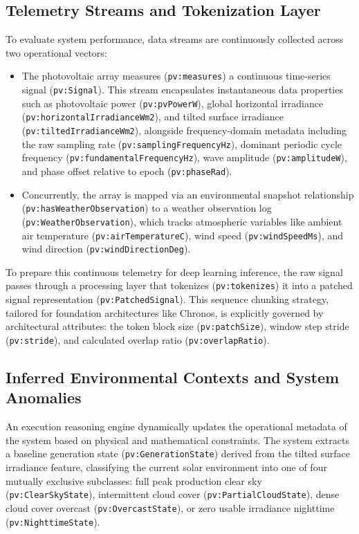 \subsection{Telemetry Streams and Tokenization Layer}
To evaluate system performance, data streams are continuously collected across two operational vectors:
\begin{itemize}
    \item The photovoltaic array measures (\texttt{pv:measures}) a continuous time-series signal (\texttt{pv:Signal}). This stream encapsulates instantaneous data properties such as photovoltaic power (\texttt{pv:pvPowerW}), global horizontal irradiance (\texttt{pv:horizontalIrradianceWm2}), and tilted surface irradiance (\texttt{pv:tiltedIrradianceWm2}), alongside frequency-domain metadata including the raw sampling rate (\texttt{pv:samplingFrequencyHz}), dominant periodic cycle frequency (\texttt{pv:fundamentalFrequencyHz}), wave amplitude (\texttt{pv:amplitudeW}), and phase offset relative to epoch (\texttt{pv:phaseRad}).
    \item Concurrently, the array is mapped via an environmental snapshot relationship (\texttt{pv:hasWeatherObservation}) to a weather observation log (\texttt{pv:WeatherObservation}), which tracks atmospheric variables like ambient air temperature (\texttt{pv:airTemperatureC}), wind speed (\texttt{pv:windSpeedMs}), and wind direction (\texttt{pv:windDirectionDeg}).
\end{itemize}
To prepare this continuous telemetry for deep learning inference, the raw signal passes through a processing layer that tokenizes (\texttt{pv:tokenizes}) it into a patched signal representation (\texttt{pv:PatchedSignal}). This sequence chunking strategy, tailored for foundation architectures like Chronos, is explicitly governed by architectural attributes: the token block size (\texttt{pv:patchSize}), window step stride (\texttt{pv:stride}), and calculated overlap ratio (\texttt{pv:overlapRatio}).

\subsection{Inferred Environmental Contexts and System Anomalies}
An execution reasoning engine dynamically updates the operational metadata of the system based on physical and mathematical constraints. The system extracts a baseline generation state (\texttt{pv:GenerationState}) derived from the tilted surface irradiance feature, classifying the current solar environment into one of four mutually exclusive subclasses: full peak production clear sky (\texttt{pv:ClearSkyState}), intermittent cloud cover (\texttt{pv:PartialCloudState}), dense cloud cover overcast (\texttt{pv:OvercastState}), or zero usable irradiance nighttime (\texttt{pv:NighttimeState}).

